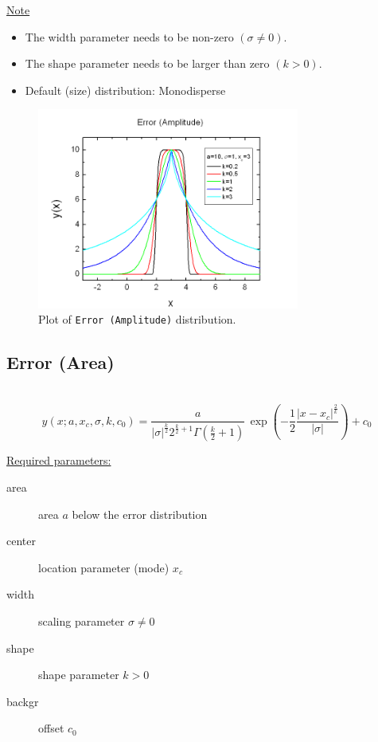 \underline{Note}
\begin{itemize}
  \item The width parameter needs to be non-zero $(\sigma\neq 0)$.
  \item The shape parameter needs to be larger than zero $(k>0)$.
  \item Default (size) distribution: Monodisperse
\end{itemize}
\begin{figure}[htb]
\begin{center}
\includegraphics[width=0.768\textwidth]{ErrorAmplitude.png}
\end{center}
\caption{Plot of \texttt{Error (Amplitude)} distribution.}
\label{fig:ErrorAmplitude}
\end{figure}

\clearpage
\subsection{Error (Area)} ~\\
\label{sec:ErrorPeakArea}
\begin{equation}
y(x;a,x_c,\sigma,k,c_0) = \frac{a}{\left|\sigma\right|^{\frac{k}{2}}2^{\frac{k}{2}+1}\Gamma\left(\frac{k}{2}+1\right)}
\, \exp\left(-\frac{1}{2}\frac{\left|x-x_c\right|^{\frac{2}{k}}}{\left|\sigma\right|}\right)+c_0
\end{equation}
\vspace{5mm}
\vspace{5mm}

\underline{Required parameters:}
\begin{description}
    \item[area] area $a$ below the error distribution
    \item[center] location parameter (mode) $x_c$
    \item[width] scaling parameter $\sigma\neq 0$
    \item[shape] shape parameter $k>0$
    \item[backgr] offset $c_0$
\end{description}

